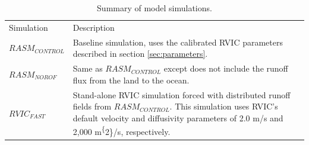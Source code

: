 \documentclass[jgrga, draft]{agutex}
\begin{document}
\begin{table}[]
  \caption{Summary of model simulations.}
  \label{table:simulations}
  \begin{tabular}{l|p{4in}}
  Simulation       & Description \\
  $RASM_{CONTROL}$ & Baseline simulation, uses the calibrated RVIC parameters described in section \ref{sec:parameters}. \\
  $RASM_{NOROF}$   & Same as $RASM_{CONTROL}$ except does not include the runoff flux from the land to the ocean. \\
  $RVIC_{FAST}$    & Stand-alone RVIC simulation forced with distributed runoff fields from $RASM_{CONTROL}$. This simulation uses RVIC's default velocity and diffusivity parameters of 2.0 m/s and 2,000 m\textsuperscript\{2\}/s, respectively.
  \end{tabular}
\end{table}


\begin{table}
  \caption{RVIC model performance statistics for the seven rivers shown in Figure \ref{fig:rasm_domain}. The overlap statistic is calculated using normalized hydrographs whereas the bias and RMSE are calculated using the unadjusted hydrographs.}
  \label{table:rivers}
\end{table}
\end{document}

